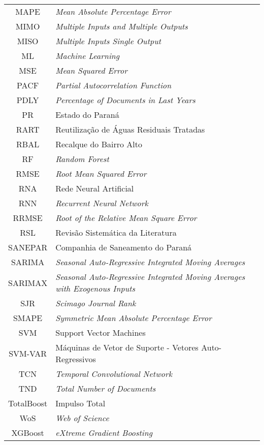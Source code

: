 \begin{tabular}{cp{}}
	MAPE & \textit{Mean Absolute Percentage Error}\\
	MIMO & \textit{Multiple Inputs and Multiple Outputs}\\
	MISO & \textit{Multiple Inputs Single Output}\\
	ML & \textit{Machine Learning}	\\
	MSE & \textit{Mean Squared Error}\\
	PACF & \textit{Partial Autocorrelation Function}\\
	PDLY & \textit{Percentage of Documents in Last Years}\\
	PR & Estado do Paraná\\
	RART & Reutilização de Águas Residuais Tratadas\\
	RBAL & Recalque do Bairro Alto\\
	RF & \textit{Random Forest}\\
	RMSE & \textit{Root Mean Squared Error}\\
	RNA & Rede Neural Artificial\\
	RNN & \textit{Recurrent Neural Network}\\
	RRMSE & \textit{Root of the Relative Mean Square Error}\\
	RSL & Revisão Sistemática da Literatura \\
	SANEPAR & Companhia de Saneamento do Paraná \\
	SARIMA & \textit{Seasonal Auto-Regressive Integrated Moving Averages} \\
	SARIMAX & \textit{Seasonal Auto-Regressive Integrated Moving Averages with Exogenous Inputs} \\
	SJR & \textit{Scimago Journal Rank}\\
	SMAPE &  \textit{Symmetric Mean Absolute Percentage Error}\\
	SVM & Support Vector Machines \\
	SVM-VAR & Máquinas de Vetor de Suporte - Vetores Auto-Regressivos\\
	TCN & \textit{Temporal Convolutional Network} \\
	TND & \textit{Total Number of Documents}\\
	TotalBoost & Impulso Total\\
	WoS & \textit{Web of Science} \\
	XGBoost & \textit{eXtreme Gradient Boosting}
\end{tabular}
